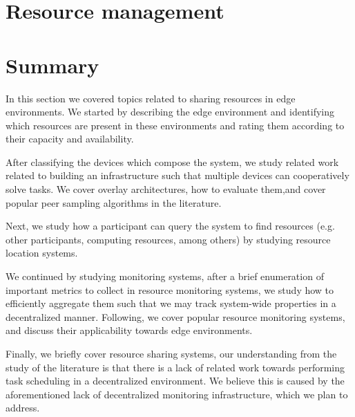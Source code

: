 \section{Resource management} \label{sec:res_management} 

\section{Summary}

In this section we covered topics related to sharing resources in edge environments. We started by describing the edge environment and identifying which resources are present in these environments and rating them according to their capacity and availability. 

After classifying the devices which compose the system, we study related work related to building an infrastructure such that multiple devices can cooperatively solve tasks. We cover overlay architectures, how to evaluate them,and cover popular peer sampling algorithms in the literature. 

Next, we study how a participant can query the system to find resources (e.g. other participants, computing resources, among others) by studying resource location systems.

We continued by studying monitoring systems, after a brief enumeration of important metrics to collect in resource monitoring systems, we study how to efficiently aggregate them such that we may track system-wide properties in a decentralized manner. Following, we cover popular resource monitoring systems, and discuss their applicability towards edge environments. 

Finally, we briefly cover resource sharing systems, our understanding from the study of the literature is that there is a lack of related work towards performing task scheduling in a decentralized environment. We believe this is caused by the aforementioned lack of decentralized monitoring infrastructure, which we plan to address.

